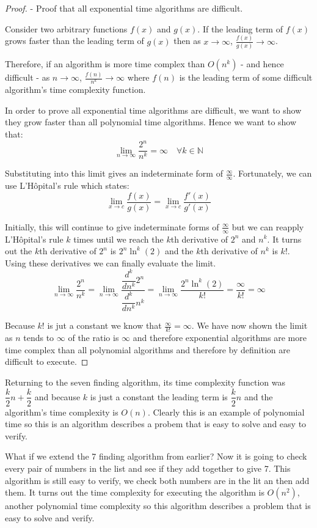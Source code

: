 \documentclass[twoside,10pt]{article}
\begin{document}
\begin{proof} - Proof that all exponential time algorithms are difficult.

Consider two arbitrary functions $f(x)$ and $g(x)$. If the leading term of $f(x)$ grows faster than the leading term of $g(x)$ then as $x\rightarrow\infty$, $\frac{f(x)}{g(x)}\rightarrow\infty$. 

Therefore, if an algorithm is more time complex than $O(n^k)$ - and hence difficult - as $n\rightarrow\infty$, $\frac{f(n)}{n^k}\rightarrow\infty$ where $f(n)$ is the leading term of some difficult algorithm's time complexity function.

In order to prove all exponential time algorithms are difficult, we want to show they grow faster than all polynomial time algorithms. Hence we want to show that:
\[\lim_{n\to\infty}\dfrac{2^n}{n^k}=\infty\quad\forall k\in\mathbb{N}\]

Substituting into this limit gives an indeterminate form of $\frac{\infty}{\infty}$. Fortunately, we can use L'Hôpital's rule which states:
\[\lim_{x\to c}\dfrac{f(x)}{g(x)}=\lim_{x\to c}\dfrac{f'(x)}{g'(x)}\]

Initially, this will continue to give indeterminate forms of $\frac{\infty}{\infty}$ but we can reapply L'Hôpital's rule $k$ times until we reach the $k$th derivative of $2^n$ and $n^k$. It turns out the $k$th derivative of $2^n$ is $2^n\ln^k{(2)}$ and the $k$th derivative of $n^k$ is $k!$. Using these derivatives we can finally evaluate the limit.
\[\lim_{n\to\infty}\dfrac{2^n}{n^k}=\lim_{n\to\infty}\dfrac{\dfrac{d^k}{dn^k}2^n}{\dfrac{d^k}{dn^k}n^k}=\lim_{n\to\infty}\dfrac{2^n\ln^k{(2)}}{k!}=\dfrac{\infty}{k!}=\infty\]

Because $k!$ is jut a constant we know that $\frac{\infty}{k!}=\infty$.  We have now shown the limit as $n$ tends to $\infty$ of the ratio is $\infty$ and therefore exponential algorithms are more time complex than all polynomial algorithms and therefore by definition are difficult to execute.
\end{proof}

Returning to the seven finding algorithm, its time complexity function was $\dfrac{k}{2}n+\dfrac{k}{2}$ and because $k$ is just a constant the leading term is $\dfrac{k}{2}n$ and the algorithm's time complexity is $O(n)$. Clearly this is an example of polynomial time so this is an algorithm describes a probem that is easy to solve and easy to verify.

What if we extend the 7 finding algorithm from earlier? Now it is going to check every pair of numbers in the list and see if they add together to give 7. This algorithm is still easy to verify, we check both numbers are in the lit an then add them. It turns out the time complexity for executing the algorithm is $O(n^2)$, another polynomial time complexity so this algorithm describes a problem that is easy to solve and verify.
\end{document}

